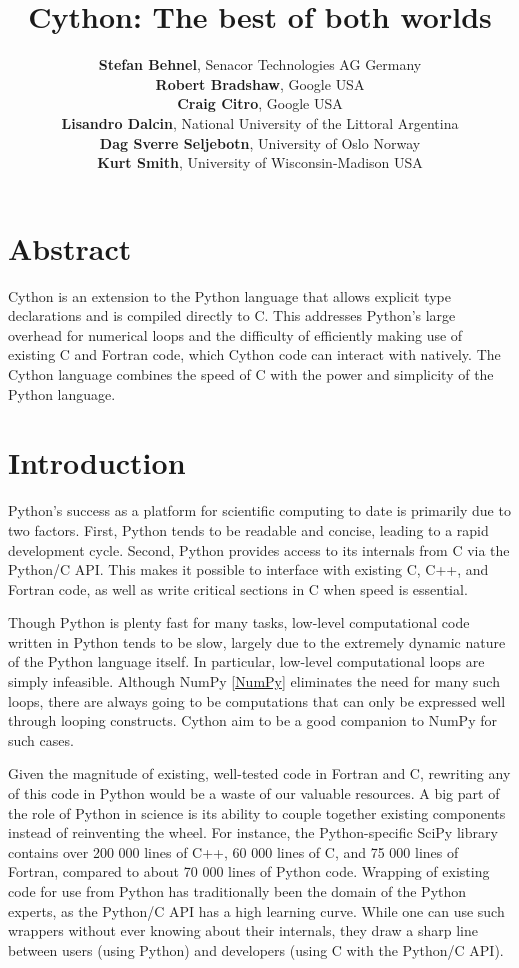 \documentclass[letterpaper,11pt,english]{article}
\title{Cython: The best of both worlds}
\date{
\begin{minipage}{.9\linewidth}
This article is published in {\sl IEEE
Computing in Science and Engineering.} Please refer to the published
version if accessible, as it contains editor's improvements.
(c) 2011 IEEE.%
\footnote{%
Personal use of this material is permitted. Permission
from IEEE must be obtained for all other users, including reprinting/
republishing this material for advertising or promotional purposes,
creating new collective works for resale or redistribution to servers or
lists, or reuse of any copyrighted components of this work in other
works.}
\hspace{3mm}
Permalink: \href{http://dx.doi.org/10.1109/MCSE.2010.118}{http://dx.doi.org/10.1109/MCSE.2010.118}%
\end{minipage}
}
\author{
{\bf\sffamily Stefan Behnel}, Senacor Technologies AG {\small\sc Germany} \\
{\bf\sffamily Robert Bradshaw}, Google {\small\sc USA} \\
{\bf\sffamily Craig Citro}, Google {\small\sc USA} \\
{\bf\sffamily Lisandro Dalcin}, National University of the Littoral {\small\sc Argentina} \\
{\bf\sffamily Dag Sverre Seljebotn}, University of Oslo {\small\sc Norway} \\
{\bf\sffamily Kurt Smith}, University of Wisconsin-Madison {\small\sc USA}
}
\begin{document}
\maketitle


\section{Abstract}

Cython is an extension to the Python language that allows explicit
type declarations and is compiled directly to C. This addresses
Python's large overhead for numerical loops and the difficulty of
efficiently making use of existing C and Fortran code, which Cython
code can interact with natively.  The Cython language combines the
speed of C with the power and simplicity of the Python language.


\section{Introduction}

Python's success as a platform for scientific computing to date is
primarily due to two factors. First, Python tends to be readable and
concise, leading to a rapid development cycle. Second, Python provides
access to its internals from C via the Python/C API. This makes it
possible to interface with existing C, C++, and Fortran code, as well
as write critical sections in C when speed is essential.

Though Python is plenty fast for many tasks, low-level computational
code written in Python tends to be slow, largely due to the extremely
dynamic nature of the Python language itself. In particular, low-level
computational loops are simply infeasible. Although NumPy \hyperlink{numpy}{{[}NumPy{]}}
eliminates the need for many such loops, there are always going to be
computations that can only be expressed well through looping
constructs. Cython aim to be a good companion to NumPy for such cases.

Given the magnitude of existing, well-tested code in Fortran and C,
rewriting any of this code in Python would be a waste of our valuable
resources.  A big part of the role of Python in science is its ability
to couple together existing components instead of reinventing the
wheel. For instance, the Python-specific SciPy library contains over
200 000 lines of C++, 60 000 lines of C, and 75 000 lines of Fortran,
compared to about 70 000 lines of Python code.  Wrapping of existing
code for use from Python has traditionally been the domain of the
Python experts, as the Python/C API has a high learning curve. While
one can use such wrappers without ever knowing about their internals,
they draw a sharp line between users (using Python) and developers
(using C with the Python/C API).
\end{document}
